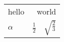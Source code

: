 \begin{tabular}{lcc}
\toprule 
\midrule 
{\color{red} hello} & \multicolumn{2}{r}{{\color{blue} world}} \\
 \cmidrule(lr){1-1} \cmidrule(lr){2-3} 
$\alpha$ & $\frac{1}{2}$ & $\sqrt{\frac{2}{3}}$ \\
\midrule 
\bottomrule 
\end{tabular}
